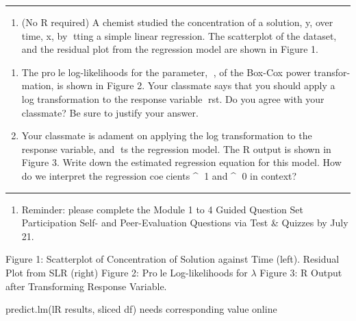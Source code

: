 \documentclass[
]{article}
\providecommand{\tightlist}{%
  \setlength{\itemsep}{0pt}\setlength{\parskip}{0pt}}
\begin{document}
\begin{center}\rule{0.5\linewidth}{0.5pt}\end{center}

\begin{enumerate}
\def\labelenumi{\arabic{enumi}.}
\setcounter{enumi}{3}
\tightlist
\item
  (No R required) A chemist studied the concentration of a solution, y,
  over time, x, by tting a simple linear regression. The scatterplot of
  the dataset, and the residual plot from the regression model are shown
  in Figure 1.
\end{enumerate}

\begin{enumerate}
\def\labelenumi{(\alph{enumi})}
\item
  The prole log-likelihoods for the parameter, , of the Box-Cox power
  transfor- mation, is shown in Figure 2. Your classmate says that you
  should apply a log transformation to the response variable rst. Do
  you agree with your classmate? Be sure to justify your answer.
\item
  Your classmate is adament on applying the log transformation to the
  response variable, and ts the regression model. The R output is shown
  in Figure 3. Write down the estimated regression equation for this
  model. How do we interpret the regression coecients \^{} 1 and \^{}
  0 in context?
\end{enumerate}

\begin{center}\rule{0.5\linewidth}{0.5pt}\end{center}

\begin{enumerate}
\def\labelenumi{\arabic{enumi}.}
\setcounter{enumi}{4}
\tightlist
\item
  Reminder: please complete the Module 1 to 4 Guided Question Set
  Participation Self- and Peer-Evaluation Questions via Test \& Quizzes
  by July 21.
\end{enumerate}

Figure 1: Scatterplot of Concentration of Solution against Time (left).
Residual Plot from SLR (right) Figure 2: Prole Log-likelihoods for
\(\lambda\) Figure 3: R Output after Transforming Response Variable.

predict.lm(lR results, sliced df) needs corresponding value online
\end{document}
